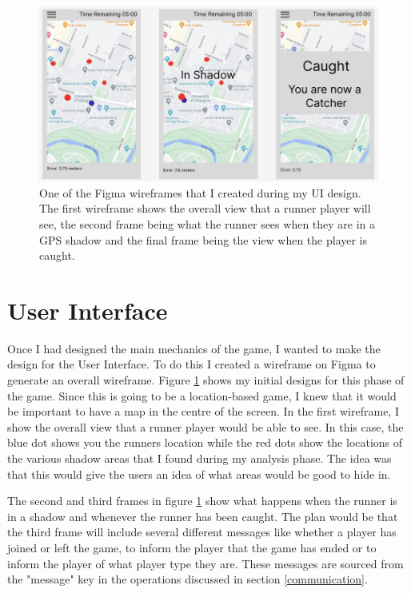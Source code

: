 \documentclass{l4proj}
\begin{document}
\begin{figure}
    \centering
    \includegraphics[width=0.7\linewidth]{images/phase1UIDesign.png}
    \caption{One of the Figma wireframes that I created during my UI design. The first wireframe shows the overall view that a runner
    player will see, the second frame being what the runner sees when they are in a GPS shadow and the final frame being the view when
    the player is caught.}
    \label{fig:phase1uidesign}
\end{figure}

\section{User Interface}
\label{phase1uidesign}
Once I had designed the main mechanics of the game, I wanted to make the design for the User Interface. To do this I created a wireframe
on Figma to generate an overall wireframe. Figure \ref{fig:phase1uidesign} shows my initial designs for this phase of the game. Since
this is going to be a location-based game, I knew that it would be important to have a map in the centre of the screen. In the first
wireframe, I show the overall view that a runner player would be able to see. In this case, the blue dot shows you the runners location while
the red dots show the locations of the various shadow areas that I found during my analysis phase. The idea was that this would give the
users an idea of what areas would be good to hide in.

The second and third frames in figure \ref{fig:phase1uidesign} show what happens when the runner is in a shadow and whenever the runner has been
caught. The plan would be that the third frame will include several different messages like whether a player has joined or left the
game, to inform the player that the game has ended or to inform the player of what player type they are. These messages are sourced
from the "message" key in the operations discussed in section \ref{communication}.
\end{document}
